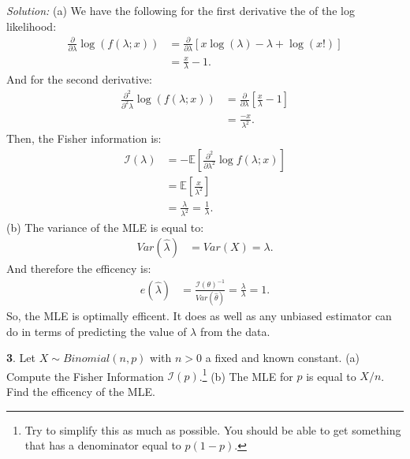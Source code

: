 \documentclass{tufte-handout}
\begin{document}
\textit{Solution:} (a) We have the following for the first derivative the of the log likelihood:
\begin{align*}
\frac{\partial}{\partial \lambda} \log(f(\lambda; x))
&= \frac{\partial}{\partial \lambda} \left[ x \log(\lambda) - \lambda + \log(x!) \right] \\
&= \frac{x}{\lambda} - 1.
\end{align*}
And for the second derivative:
\begin{align*}
\frac{\partial^2}{\partial^2 \lambda} \log(f(\lambda; x))
&= \frac{\partial}{\partial \lambda} \left[ \frac{x}{\lambda} - 1 \right] \\
&= \frac{-x}{\lambda^2}.
\end{align*}
Then, the Fisher information is:
\begin{align*}
\mathcal{I}(\lambda) &= - \mathbb{E} \left[ \frac{\partial^2}{\partial \lambda^2} \log f(\lambda; x) \right] \\
&= \mathbb{E} \left[ \frac{x}{\lambda^2} \right] \\
&= \frac{\lambda}{\lambda^2} = \frac{1}{\lambda}.
\end{align*}
(b) The variance of the MLE is equal to:
\begin{align*}
Var(\hat{\lambda}) &= Var(X) = \lambda.
\end{align*}
And therefore the efficency is:
\begin{align*}
e(\hat{\lambda}) &= \frac{\mathcal{I}(\theta)^{-1}}{Var(\widehat{\theta})} = \frac{\lambda}{\lambda} = 1.
\end{align*}
So, the MLE is optimally efficent. It does as well as any unbiased estimator can do in
terms of predicting the value of $\lambda$ from the data.

\textbf{3}. Let $X \sim Binomial(n, p)$ with $n>0$ a fixed and known constant.
(a) Compute the Fisher Information $\mathcal{I}(p)$.\footnote{
  Try to simplify this as much as possible. You should be able to
  get something that has a denominator equal to $p(1-p)$.
} (b) The MLE for $p$ is
equal to $X/n$. Find the efficency of the MLE.
\end{document}
